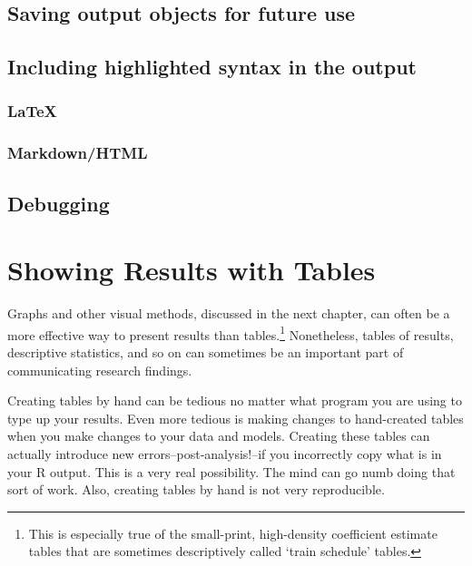 \documentclass[ChapterTOCs,krantz1]{krantz}\usepackage{graphicx, color}
\begin{document}
\section{Saving output objects for future use}

\section{Including highlighted syntax in the output}

\subsection{\LaTeX}

\subsection{Markdown/HTML}

\section{Debugging}





\chapter{Showing Results with Tables}

Graphs and other visual methods, discussed in the next chapter, can
often be a more effective way to present results than tables.\footnote{This
  is especially true of the small-print, high-density coefficient
  estimate tables that are sometimes descriptively called `train
  schedule' tables.} Nonetheless, tables of results, descriptive statistics,
and so on can sometimes be an important part of communicating
research findings.

Creating tables by hand can be tedious no matter what program you are
using to type up your results. Even more tedious is making changes to
hand-created tables when you make changes to your data and models.
Creating these tables can actually introduce new
errors--post-analysis!--if you incorrectly copy what is in your
R output. This is a very real possibility. The mind can go numb
doing that sort of work. Also, creating tables by hand is not very
reproducible.
\end{document}
